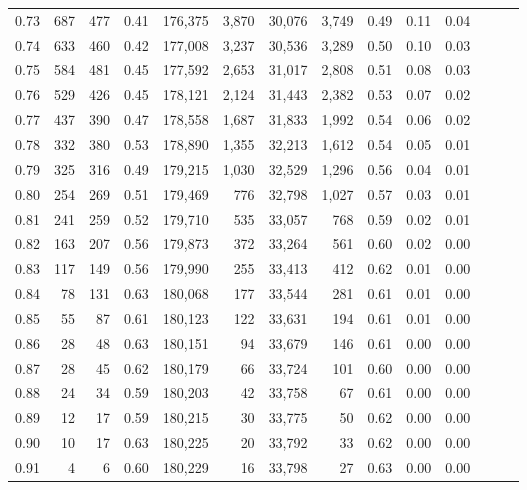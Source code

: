 \begin{tabular}{rrrrrrrrrrrrrr}
0.73 &    687 &  477 &  0.41 &  176,375 &    3,870 &  30,076 &   3,749 &  0.49 &  0.11 &      0.04 \\
0.74 &    633 &  460 &  0.42 &  177,008 &    3,237 &  30,536 &   3,289 &  0.50 &  0.10 &      0.03 \\
0.75 &    584 &  481 &  0.45 &  177,592 &    2,653 &  31,017 &   2,808 &  0.51 &  0.08 &      0.03 \\
0.76 &    529 &  426 &  0.45 &  178,121 &    2,124 &  31,443 &   2,382 &  0.53 &  0.07 &      0.02 \\
0.77 &    437 &  390 &  0.47 &  178,558 &    1,687 &  31,833 &   1,992 &  0.54 &  0.06 &      0.02 \\
0.78 &    332 &  380 &  0.53 &  178,890 &    1,355 &  32,213 &   1,612 &  0.54 &  0.05 &      0.01 \\
0.79 &    325 &  316 &  0.49 &  179,215 &    1,030 &  32,529 &   1,296 &  0.56 &  0.04 &      0.01 \\
0.80 &    254 &  269 &  0.51 &  179,469 &      776 &  32,798 &   1,027 &  0.57 &  0.03 &      0.01 \\
0.81 &    241 &  259 &  0.52 &  179,710 &      535 &  33,057 &     768 &  0.59 &  0.02 &      0.01 \\
0.82 &    163 &  207 &  0.56 &  179,873 &      372 &  33,264 &     561 &  0.60 &  0.02 &      0.00 \\
0.83 &    117 &  149 &  0.56 &  179,990 &      255 &  33,413 &     412 &  0.62 &  0.01 &      0.00 \\
0.84 &     78 &  131 &  0.63 &  180,068 &      177 &  33,544 &     281 &  0.61 &  0.01 &      0.00 \\
0.85 &     55 &   87 &  0.61 &  180,123 &      122 &  33,631 &     194 &  0.61 &  0.01 &      0.00 \\
0.86 &     28 &   48 &  0.63 &  180,151 &       94 &  33,679 &     146 &  0.61 &  0.00 &      0.00 \\
0.87 &     28 &   45 &  0.62 &  180,179 &       66 &  33,724 &     101 &  0.60 &  0.00 &      0.00 \\
0.88 &     24 &   34 &  0.59 &  180,203 &       42 &  33,758 &      67 &  0.61 &  0.00 &      0.00 \\
0.89 &     12 &   17 &  0.59 &  180,215 &       30 &  33,775 &      50 &  0.62 &  0.00 &      0.00 \\
0.90 &     10 &   17 &  0.63 &  180,225 &       20 &  33,792 &      33 &  0.62 &  0.00 &      0.00 \\
0.91 &      4 &    6 &  0.60 &  180,229 &       16 &  33,798 &      27 &  0.63 &  0.00 &      0.00 \\

\end{tabular}
